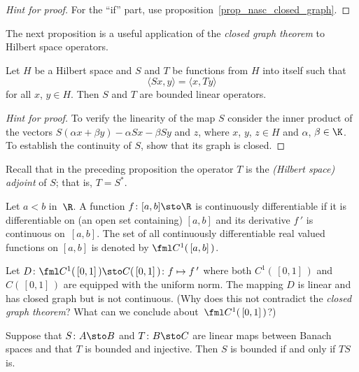 \begin{proof}[\emph{Hint for proof}] For the ``if'' part, use proposition~\ref{prop_nasc_closed_graph}.  \ns
\end{proof}

The next proposition is a useful application of the \emph{closed graph theorem} to Hilbert space operators.

\begin{prop} Let $H$ be a Hilbert space and $S$ and $T$ be functions from $H$ into itself such that
    \[ \langle Sx,y \rangle = \langle x,Ty \rangle \]
for all $x$, $y \in H$.  Then $S$ and $T$ are bounded linear operators.
\end{prop}

\begin{proof}[\emph{Hint for proof}] To verify the linearity of the map $S$ consider the inner product of the vectors
$S(\alpha x + \beta y) - \alpha Sx - \beta Sy$ and $z$, where $x$, $y$, $z \in H$ and $\alpha$, $\beta \in \K$.
To establish the continuity of $S$, show that its graph is closed.  \ns
\end{proof}

Recall that in the preceding proposition the operator $T$ is the \emph{(Hilbert space) adjoint} of $S$;
that is, $T = S^*$.

\begin{defn} Let $a < b$ in~$\R$. A function $f\colon [a,b] \sto \R$ is
continuously differentiable if it is differentiable on (an open set containing) $[a,b]$
and its derivative $f\,'$ is continuous on~$[a,b]$.  The set of all continuously
differentiable real valued functions on $[a,b]$ is denoted by $\fml C^1(\,[a,b]\,)$.
\end{defn}

\begin{exam} Let $D\colon \fml C^1(\,[0,1]\,) \sto C(\,[0,1]\,)\colon f \mapsto f\,'$ where
both $C^1(\,[0,1]\,)$ and $C(\,[0,1]\,)$ are equipped with the uniform norm. The mapping
$D$ is linear and has closed graph but is not continuous.  (Why does this not contradict
the \emph{closed graph theorem}?  What can we conclude about~$\fml C^1(\,[0,1]\,)$?)
\end{exam}

\begin{prop} Suppose that $S\colon A \sto B$ and $T\colon B \sto C$ are linear maps between
Banach spaces and that $T$ is bounded and injective.  Then $S$ is bounded if and only if $TS$ is.
\end{prop}

















